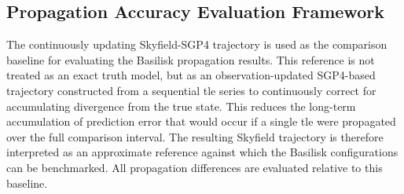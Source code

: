 \subsection{Propagation Accuracy Evaluation Framework}
\label{sec:propagation_accuracy_evaluation_framework}

The continuously updating Skyfield-SGP4 trajectory is used as the comparison baseline for evaluating the Basilisk propagation results. This reference is not treated as an exact truth model, but as an observation-updated SGP4-based trajectory constructed from a sequential \gls{tle} series to continuously correct for accumulating divergence from the true state. This reduces the long-term accumulation of prediction error that would occur if a single \gls{tle} were propagated over the full comparison interval. The resulting Skyfield trajectory is therefore interpreted as an approximate reference against which the Basilisk configurations can be benchmarked. All propagation differences are evaluated relative to this baseline.

